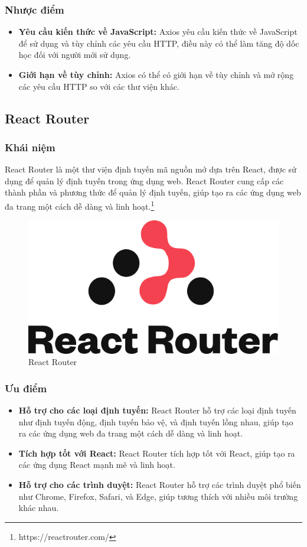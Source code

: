 \subsubsection{Nhược điểm}
\begin{itemize}
  \item \textbf{Yêu cầu kiến thức về JavaScript:} Axios yêu cầu kiến thức về JavaScript để sử dụng và tùy chỉnh các yêu cầu HTTP, điều này có thể làm tăng độ dốc học đối với người mới sử dụng.
  \item \textbf{Giới hạn về tùy chỉnh:} Axios có thể có giới hạn về tùy chỉnh và mở rộng các yêu cầu HTTP so với các thư viện khác.
\end{itemize}
\subsection{React Router}
\subsubsection{Khái niệm}
\noindent React Router là một thư viện định tuyến mã nguồn mở dựa trên React, được sử dụng để quản lý định tuyến trong ứng dụng web. React Router cung cấp các thành phần và phương thức để quản lý định tuyến, giúp tạo ra các ứng dụng web đa trang một cách dễ dàng và linh hoạt.\footnote{https://reactrouter.com/}
\begin{figure}[H]
  \begin{center}
    \includegraphics[scale=0.3]{images/hieu/phuluc/react-router.png}
    \caption{React Router}
  \end{center}
\end{figure}
\subsubsection{Ưu điểm}
\begin{itemize}
  \item \textbf{Hỗ trợ cho các loại định tuyến:} React Router hỗ trợ các loại định tuyến như định tuyến động, định tuyến bảo vệ, và định tuyến lồng nhau, giúp tạo ra các ứng dụng web đa trang một cách dễ dàng và linh hoạt.
  \item \textbf{Tích hợp tốt với React:} React Router tích hợp tốt với React, giúp tạo ra các ứng dụng React mạnh mẽ và linh hoạt.
  \item \textbf{Hỗ trợ cho các trình duyệt:} React Router hỗ trợ các trình duyệt phổ biến như Chrome, Firefox, Safari, và Edge, giúp tương thích với nhiều môi trường khác nhau.
\end{itemize}

